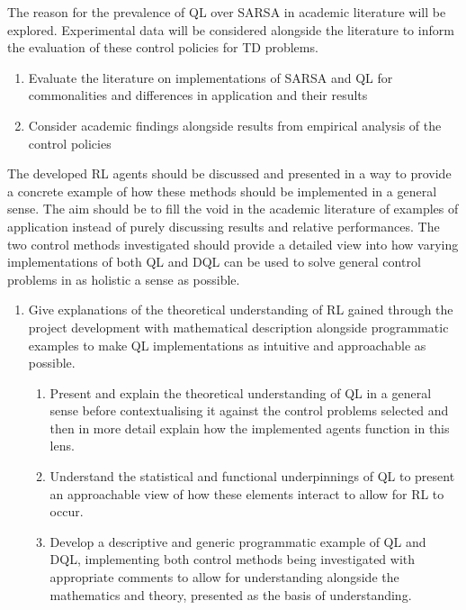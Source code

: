 \documentclass[hidelinks,journal]{IEEEtran}
\begin{document}
The reason for the prevalence of QL over SARSA in academic literature will be explored. Experimental data will be considered alongside the literature to inform the evaluation of these control policies for TD problems.
\begin{enumerate}
  \item Evaluate the literature on implementations of SARSA and QL for commonalities and differences in application and their results
  \item Consider academic findings alongside results from empirical analysis of the control policies
\end{enumerate}

The developed RL agents should be discussed and presented in a way to provide a concrete example of how these methods should be implemented in a general sense. The aim should be to fill the void in the academic literature of examples of application instead of purely discussing results and relative performances. The two control methods investigated should provide a detailed view into how varying implementations of both QL and DQL can be used to solve general control problems in as holistic a sense as possible.
\begin{enumerate}
  \item{Give explanations of the theoretical understanding of RL gained through the project development with mathematical description alongside programmatic examples to make QL implementations as intuitive and approachable as possible.}
  \begin{enumerate}
    \item{Present and explain the theoretical understanding of QL in a general sense before contextualising it against the control problems selected and then in more detail explain how the implemented agents function in this lens.}
    \item{Understand the statistical and functional underpinnings of QL to present an approachable view of how these elements interact to allow for RL to occur.}
    \item{Develop a descriptive and generic programmatic example of QL and DQL, implementing both control methods being investigated with appropriate comments to allow for understanding alongside the mathematics and theory, presented as the basis of understanding.}
  \end{enumerate}
\end{enumerate}
\end{document}
